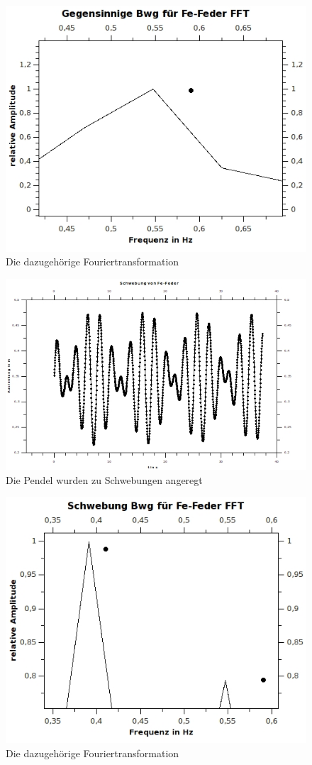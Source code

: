 \begin{figure}[h!]
\centering
\includegraphics[width=0.7\linewidth]{../Messungen/graphen/gg-Bwg-Fe-FFT}
\caption{Die dazugehörige Fouriertransformation}
\label{fig:gg-Bwg-Fe-FFT}
\end{figure}

\clearpage

\begin{figure}[h!]
\centering
\includegraphics[width=0.7\linewidth]{../Messungen/graphen/schwebung-Fe}
\caption{Die Pendel wurden zu Schwebungen angeregt}
\label{fig:schwebung-Fe}
\end{figure}

\begin{figure}[h!]
\centering
\includegraphics[width=0.7\linewidth]{../Messungen/graphen/SchwebungvonFe-FederFFT}
\caption{Die dazugehörige Fouriertransformation}
\label{fig:SchwebungvonFe-FederFFT}
\end{figure}

